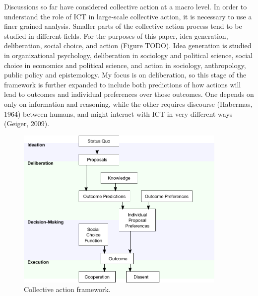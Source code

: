 Discussions so far have considered collective action at a macro level. In order to understand the role of ICT in large-scale collective action, it is necessary to use a finer grained analysis. Smaller parts of the collective action process tend to be studied in different fields. For the purposes of this paper, idea generation, deliberation, social choice, and action (Figure TODO). Idea generation is studied in organizational psychology, deliberation in sociology and political science, social choice in economics and political science, and action in sociology, anthropology, public policy and epistemology. My focus is on deliberation, so this stage of the framework is further expanded to include both predictions of how actions will lead to outcomes and individual preferences over those outcomes. One depends  on only on information and reasoning, while the other requires discourse (Habermas, 1964) between humans, and might interact with ICT in very different ways (Geiger, 2009).

\begin{figure}
\centering
\includegraphics[width=4in]{images/fig-framework.pdf}
\caption{
Collective action framework.\label{fig:framework}
}
\end{figure}

